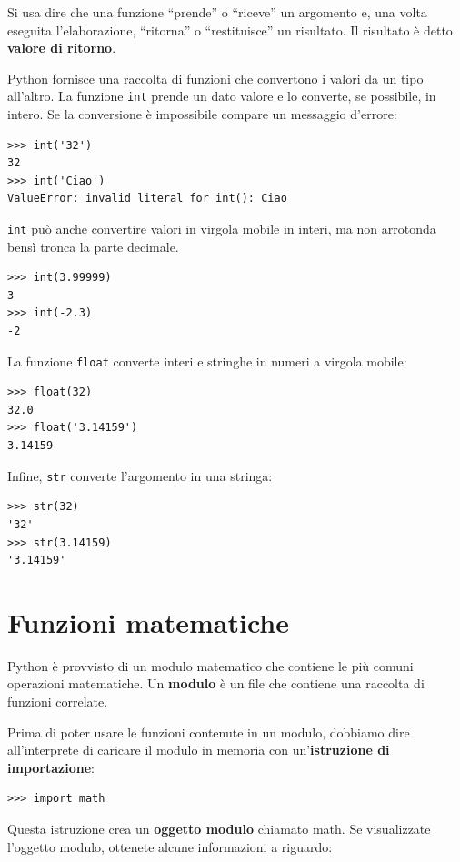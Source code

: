 \documentclass[10pt]{book}
\begin{document}
Si usa dire che una funzione ``prende'' o ``riceve'' un argomento e, una volta eseguita l'elaborazione, ``ritorna'' o ``restituisce'' un risultato.  Il risultato è detto {\bf valore di ritorno}.

Python fornisce una raccolta di funzioni che convertono i valori da un tipo all'altro. La funzione {\tt int} prende un dato valore e lo converte, se possibile, in intero. Se la conversione è impossibile compare un messaggio d'errore:

\begin{verbatim}
>>> int('32')
32
>>> int('Ciao')
ValueError: invalid literal for int(): Ciao
\end{verbatim}
%
{\tt int} può anche convertire valori in virgola mobile in interi, ma non arrotonda bensì tronca la parte decimale.

\begin{verbatim}
>>> int(3.99999)
3
>>> int(-2.3)
-2
\end{verbatim}
%
La funzione {\tt float} converte interi e stringhe in numeri a virgola mobile:

\begin{verbatim}
>>> float(32)
32.0
>>> float('3.14159')
3.14159
\end{verbatim}
%
Infine, {\tt str} converte l'argomento in una stringa:

\begin{verbatim}
>>> str(32)
'32'
>>> str(3.14159)
'3.14159'
\end{verbatim}
%

\section{Funzioni matematiche}

Python è provvisto di un modulo matematico che contiene le più comuni operazioni matematiche. Un {\bf modulo} è un file che contiene una raccolta di funzioni correlate.

Prima di poter usare le funzioni contenute in un modulo, dobbiamo dire all'interprete di caricare il modulo in memoria con un'{\bf istruzione di importazione}:

\begin{verbatim}
>>> import math
\end{verbatim}
%
Questa istruzione crea un {\bf oggetto modulo} chiamato math. Se visualizzate l'oggetto modulo, ottenete alcune informazioni a riguardo:
\end{document}
